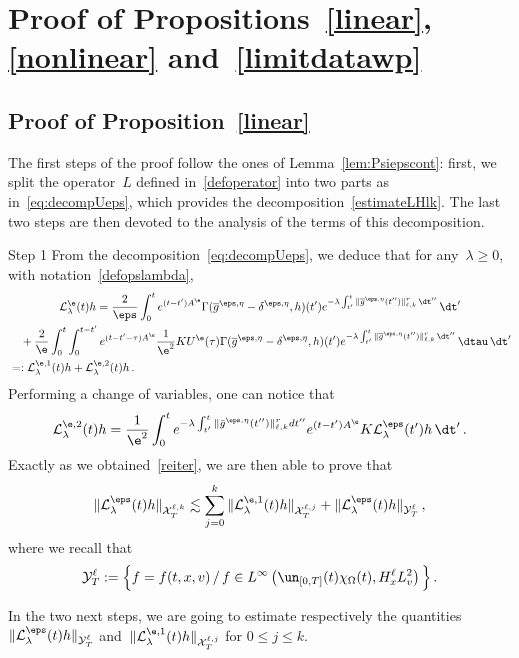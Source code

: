 \section{Proof of Propositions~\ref{linear}, \ref{nonlinear} and~\ref{limitdatawp}}
\subsection{Proof of Proposition~\ref{linear}}
The first steps of the proof follow the ones of Lemma~\ref{lem:Psiepscont}: first, we split the operator~$L$ defined in~\eqref{defoperator} into two parts as in~\eqref{eq:decompUeps}, which provides the decomposition~\eqref{estimateLHlk}. The last two steps are then devoted to the analysis of the terms of this decomposition.

\begin{step}{Step 1}
From the decomposition~\eqref{eq:decompUeps}, we deduce that for any~$\lambda \geq 0$, with notation~\eqref{defopslambda},
\begin{multline*}
\mathcal{L}_\lambda^{\e}(t)h = \frac{2}{\eps} \int_0^te^{(t-t')A^\e} \Gamma(\overline g^{\eps,\eta}- \delta^{\eps,\eta},h) (t') e^{-\lambda \int_{t'}^t \|\overline g^{\eps,\eta}(t'')\|_{\ell,k}^r\, \dt'' } \, \dt'\\
\begin{aligned}
&\quad+ \frac{2}{\e} \int_0^t \int_0^{t-t'} e^{(t-t'-\tau)A^\e} \frac{1}{\e^2} K U^\e(\tau) \Gamma(\overline g^{\eps,\eta}- \delta^{\eps,\eta},h) (t')e^{-\lambda \int_{t'}^t \|\overline g^{\eps,\eta}(t'')\|_{\ell,k}^r\, \dt'' } \,\dtau \, \dt' \\
&=: \mathcal{L}_\lambda^{\e,1}(t)h + \mathcal{L}_\lambda^{\e,2}(t)h\,.
\end{aligned}
\end{multline*}
Performing a change of variables, one can notice that
\[
\mathcal{L}_\lambda^{\e,2}(t)h = \frac{1}{\e^2} \int_0^t e^{-\lambda \int_{t'}^t \|\bar g^{\eps,\eta} (t'')\|_{\ell,k}^r dt''} e^{(t-t')A^\e} K \mathcal{L}^{\eps}_\lambda (t') h \, \dt'\,.
\]
Exactly as we obtained~\eqref{reiter}, we are then able to prove that
\begin{equation}\label{estimateLHlk}
\| \mathcal{L}^{\eps}_\lambda (t)h\|_{{\mathcal X}_T^{\ell,k} } \lesssim \sum_{j=0}^k \|\mathcal{L}_\lambda^{\e,1}(t)h\|_{{\mathcal X}_T^{\ell,j}} + \| \mathcal{L}^{\eps}_\lambda (t)h\|_{{\mathcal Y}_T^\ell} \,,
\end{equation}
where we recall that
\[
\mathcal{Y}_T^\ell :=
\Big\{f = f(t,x,v) \, / \, f\in L^\infty\left(\un_{[0,T]}(t)\chi_\Omega(t),H^\ell_xL^2_v\right)\Big\}\,.
\]
\end{step}
In the two next steps, we are going to estimate respectively the quantities \linebreak$\| \mathcal{L}^{\eps}_\lambda (t)h\|_{\mathcal{Y}_T^\ell}$ and~$\|\mathcal{L}_\lambda^{\e,1}(t)h\|_{{\mathcal X}_T^{\ell,j}}$ for $0 \le j \le k$.

